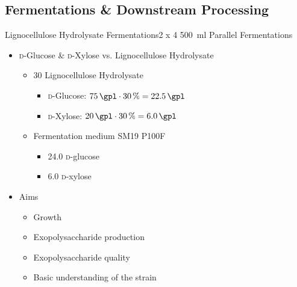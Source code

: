 \documentclass[mathserif]{beamer}
\newcommand{\SIpct}[1]{\SI{#1}{\percent}} %
\newcommand{\SIml}[1]{\SI{#1}{\ml}} %
\newcommand{\SIgpl}[1]{\SI{#1}{\gpl}} %
\newcommand{\LCH}{Lignocellulose Hydrolysate}
\newcommand{\EPS}{Exopolysaccharide}
\newcommand{\GLC}{\textsc{d}-Glu\-cose}
\newcommand{\glc}{\textsc{d}-glu\-cose}
\newcommand{\XYL}{\textsc{d}-Xy\-lose}
\newcommand{\xyl}{\textsc{d}-xy\-lose}
\begin{document}
\subsection{Fermentations \& Downstream Processing}

\begin{frame}{\LCH{} Fermentations}{2 x 4 \SIml{500} Parallel Fermentations}
	\begin{itemize}
		\item \GLC{} \& \XYL{} vs. \LCH{}
		\pause
			\begin{itemize}
				\item \SI{30}{\volpercent} \LCH{}
					\begin{itemize}
						\pause
						\item \GLC{}: $\SIgpl{75} \cdot \SIpct{30} = \SIgpl{22.5}$
						\item \XYL{}: $\SIgpl{20} \cdot \SIpct{30} = \SIgpl{6.0}$
					\end{itemize}
				\pause
				\item Fermentation medium SM19 P100F
					\begin{itemize}
						\pause
						\item \SIgpl{24.0} \glc{}
						\item \SIgpl{6.0} \xyl{}
					\end{itemize}
			\end{itemize}
		\pause
		\item Aims
			\begin{itemize}
				\item Growth
				\pause
				\item \EPS{} production
				\item \EPS{} quality
				\pause
				\item Basic understanding of the strain
			\end{itemize}
	\end{itemize}
\end{frame}
\end{document}

